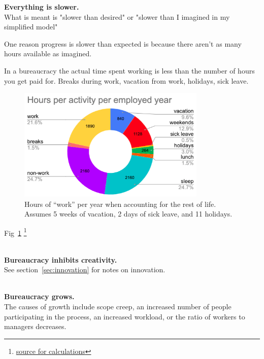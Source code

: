 \textbf{Everything is slower.}\\
What is meant is "slower than desired" or "slower than I imagined in my simplified model"

One reason progress is slower than expected is because there aren't as many hours available as imagined.



In a bureaucracy the actual time spent working is less than the number of hours you get paid for. Breaks during work, vacation from work, holidays, sick leave. 


\begin{figure}[H]
    \centering
    \includegraphics[width=0.8\textwidth]{images/hours_per_activity_per_employed_year}
    \caption{Hours of ``work'' per year when accounting for the rest of life. Assumes 5 weeks of vacation, 2 days of sick leave, and 11 holidays.}
    \label{fig:hours_per_year}
\end{figure}

Fig~\ref{fig:hours_per_year}
\footnote{\href{https://docs.google.com/spreadsheets/d/1ZaOZZXWkEzX4fFltUdlR4A6ENrAXnkzTW4YrjA4tDO8/edit?usp=sharing}{source for calculations}}

\ \\

\textbf{Bureaucracy inhibits creativity.}\\
See section~\ref{sec:innovation} for notes on innovation.

\ \\

\textbf{Bureaucracy grows.}\\
The causes of growth include
scope creep, an increased number of people participating in the process, an increased workload, or the ratio of workers to managers decreases. 

